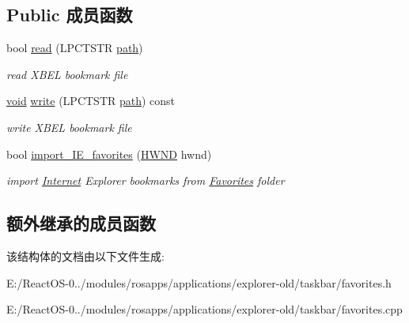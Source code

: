 \subsection*{Public 成员函数}
\begin{DoxyCompactItemize}
\item 
\mbox{\label{struct_favorites_a001b69d8e23c401e5ca0ef02313c5ea2}} 
bool \hyperlink{struct_favorites_a001b69d8e23c401e5ca0ef02313c5ea2}{read} (L\+P\+C\+T\+S\+TR \hyperlink{structpath}{path})
\begin{DoxyCompactList}\small\item\em read X\+B\+EL bookmark file \end{DoxyCompactList}\item 
\mbox{\label{struct_favorites_a39443b4765717bf1a44943a71fb3a90e}} 
\hyperlink{interfacevoid}{void} \hyperlink{struct_favorites_a39443b4765717bf1a44943a71fb3a90e}{write} (L\+P\+C\+T\+S\+TR \hyperlink{structpath}{path}) const
\begin{DoxyCompactList}\small\item\em write X\+B\+EL bookmark file \end{DoxyCompactList}\item 
\mbox{\label{struct_favorites_a1f247b6e83ebffa220ca86cc38cc5f09}} 
bool \hyperlink{struct_favorites_a1f247b6e83ebffa220ca86cc38cc5f09}{import\+\_\+\+I\+E\+\_\+favorites} (\hyperlink{interfacevoid}{H\+W\+ND} hwnd)
\begin{DoxyCompactList}\small\item\em import \hyperlink{class_internet}{Internet} Explorer bookmarks from \hyperlink{struct_favorites}{Favorites} folder \end{DoxyCompactList}\end{DoxyCompactItemize}
\subsection*{额外继承的成员函数}


该结构体的文档由以下文件生成\+:\begin{DoxyCompactItemize}
\item 
E\+:/\+React\+O\+S-\/0../modules/rosapps/applications/explorer-\/old/taskbar/favorites.\+h\item 
E\+:/\+React\+O\+S-\/0../modules/rosapps/applications/explorer-\/old/taskbar/favorites.\+cpp\end{DoxyCompactItemize}
